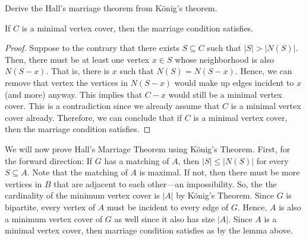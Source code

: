 \question Derive the Hall's marriage theorem from König's theorem.

\begin{solution}
  
  \begin{lemma}
    If \(C\) is a minimal vertex cover, then the marriage condition satisfies.
  \end{lemma}

  \begin{proof}
    Suppose to the contrary that there exists \(S \subseteq C\) such that \(|S|
    > |N(S)|\). Then, there must be at least one vertex \(x \in S\) whose
    neighborhood is also \(N(S-x)\). That is, there is \(x\) such that \(N(S)
    = N(S-x)\). Hence, we can remove that vertex the vertices in \(N(S-x)\)
    would make up edges incident to \(x\) (and more) anyway. This implies that
    \(C-x\) would still be a minimal vertex cover. This is a contradiction since
    we already assume that \(C\) is a minimal vertex cover already. Therefore,
    we can conclude that if \(C\) is a minimal vertex cover, then the marriage
    condition satisfies.
  \end{proof}

  We will now prove Hall's Marriage Theorem using K\"onig's Theorem. First, for
  the forward direction: If \(G\) has a matching of \(A\), then \(|S| \leq
  |N(S)|\) for every \(S \subseteq A\). Note that the matching of \(A\) is
  maximal. If not, then there must be more vertices in \(B\) that are adjacent
  to each other---an impossibility. So, the the cardinality of the minimum
  vertex cover is \(|A|\) by K\"onig's Theorem. Since \(G\) is bipartite, every
  vertex of \(A\) must be incident to every edge of \(G\). Hence, \(A\) is also
  a minimum vertex cover of \(G\) as well since it also has size \(|A|\). Since
  \(A\) is a minimal vertex cover, then marriage condition satisfies as by the
  lemma above.


\end{solution}
